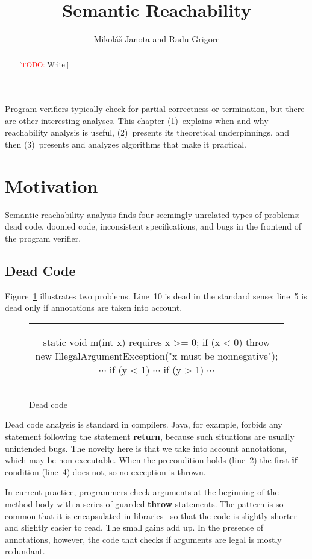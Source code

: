 \documentclass[a4paper]{article}
\title{Semantic Reachability}
\author{Mikol\'a\v{s} Janota and Radu Grigore}
\date{}
\newcommand{\todo}[1]{{\small [\textcolor{red}{TODO:} #1]}}
\newcommand{\bc}{\begin{figure}\centering\begin{tabular}{c}} %
\newcommand{\ec}[2]{\end{tabular}\caption{#1}\label{#2}\end{figure}} %
\theoremstyle{slanted}
\theoremstyle{definition}
\theoremstyle{remark}
\begin{document}
\maketitle
\begin{abstract}
  \todo{Write.}
\end{abstract}

Program verifiers typically check for partial correctness or
termination, but there are other interesting analyses. This
chapter (1)~explains when and why reachability analysis is
useful, (2)~presents its theoretical underpinnings, and then
(3)~presents and analyzes algorithms that make it practical.

\section{Motivation}

Semantic reachability analysis finds four seemingly unrelated
types of problems: dead code, doomed code, inconsistent
specifications, and bugs in the frontend of the program verifier.

\subsection{Dead Code}

Figure~\ref{fig:ra-dead-code-ex} illustrates two problems.
Line~10 is dead in the standard sense; line~5 is dead only
if annotations are taken into account. 
  
\bc
\begin{jml}
static void m(int x) 
  requires x >= 0;
{
  if (x < 0)
    throw new IllegalArgumentException("x must be nonnegative");
  $\cdots$
  if (y < 1) {
    $\cdots$
    if (y > 1) {
      $\cdots$
  }}
}
\end{jml}
\ec{Dead code}{fig:ra-dead-code-ex}

Dead code analysis is standard in compilers. Java, for example,
forbids any statement following the statement \textbf{return},
because such situations are usually unintended bugs. The novelty
here is that we take into account annotations, which may be
non-executable. When the precondition holds (line~2) the first
\textbf{if} condition (line~4) does not, so no exception is
thrown.

In current practice, programmers check arguments at the beginning
of the method body with a series of guarded \textbf{throw}
statements. The pattern is so common that it is encapsulated in
libraries~\cite{google-collect} so that the code is slightly
shorter and slightly easier to read. The small gains add up. In
the presence of annotations, however, the code that checks if
arguments are legal is mostly redundant.
\end{document}

